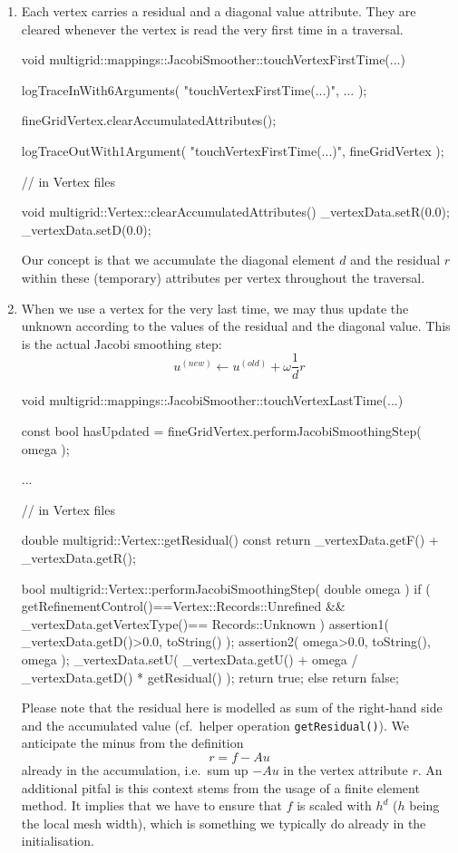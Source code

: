 \begin{enumerate}
  \item Each vertex carries a residual and a diagonal value attribute. 
    They are cleared whenever the vertex is read the very first time in
    a traversal.
    \begin{code}
void multigrid::mappings::JacobiSmoother::touchVertexFirstTime(...) {
  logTraceInWith6Arguments( "touchVertexFirstTime(...)", ... );

  fineGridVertex.clearAccumulatedAttributes();

  logTraceOutWith1Argument( "touchVertexFirstTime(...)", fineGridVertex );
}

// in Vertex files

void multigrid::Vertex::clearAccumulatedAttributes() {
  _vertexData.setR(0.0);
  _vertexData.setD(0.0);
}
    \end{code}
    
    \noindent
    Our concept is that we accumulate the diagonal element $d$ and the residual
    $r$ within these (temporary) attributes per vertex throughout the traversal.
    
    \item When we use a vertex for the very last time, we may thus update the
    unknown according to the values of the residual and the diagonal value. This
    is the actual Jacobi smoothing step:
    \[
      u ^{(new)} \gets u ^{(old)} + \omega \frac{1}{d} r
    \]
    \begin{code}
void multigrid::mappings::JacobiSmoother::touchVertexLastTime(...) {
  const bool hasUpdated = fineGridVertex.performJacobiSmoothingStep( omega );
  
  ...
}

// in Vertex files

double multigrid::Vertex::getResidual() const {
  return _vertexData.getF() + _vertexData.getR();
}


bool multigrid::Vertex::performJacobiSmoothingStep( double omega ) {
  if (
    getRefinementControl()==Vertex::Records::Unrefined
    &&
    _vertexData.getVertexType()== Records::Unknown
  ) {
    assertion1( _vertexData.getD()>0.0, toString() );
    assertion2( omega>0.0, toString(), omega );
    _vertexData.setU( _vertexData.getU() + omega / _vertexData.getD() * getResidual() );
    return true;
  }
  else {
    return false;
  }
}
    \end{code} 
    
    \noindent
    Please note that the residual here is modelled as sum of the right-hand
    side and the accumulated value (cf.~helper operation
    \texttt{getResidual()}).
    We anticipate the minus from the definition 
    \[ r = f - Au \]
    already in the accumulation, i.e.~sum up $-Au$ in the vertex attribute $r$.
    An additional pitfal is this context stems from the usage of a finite
    element method.
    It implies that we have to ensure that $f$ is scaled with $h^d$ ($h$ being the local mesh width), which is something we typically
    do already in the initialisation. 
    

\end{enumerate}
